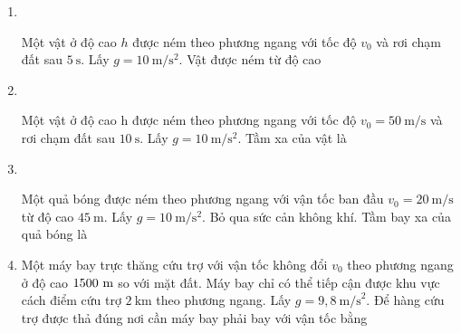 \begin{enumerate}[label=\bfseries Câu \arabic*:]
\item {}\\
{Một vật ở độ cao $h$ được ném theo phương ngang với tốc độ $v_0$ và rơi chạm đất sau $\SI{5}{\second}$. Lấy $g=\SI{10}{\meter/\second^2}$. Vật được ném từ độ cao
	\begin{mcq}(4)
		\item $\SI{100}{\meter}$.
		\item $\SI{125}{\meter}$.
		\item $\SI{200}{\meter}$.
		\item $\SI{30}{\meter}$.
	\end{mcq}

}

\item {}\\
{Một vật ở độ cao h được ném theo phương ngang với tốc độ $v_0 = \SI{50}{\meter/\second}$ và rơi chạm đất sau $\SI{10}{\second}$. Lấy $g = \SI{10}{\meter/\second^2}$. Tầm xa của vật là
}

\item {}\\
{Một quả bóng được ném theo phương ngang với vận tốc ban đầu $v_0 = \SI{20}{\meter/\second}$ từ độ cao $\SI{45}{\meter}$. Lấy $g = \SI{10}{\meter/\second^2}$. Bỏ qua sức cản không khí. Tầm bay xa của quả bóng là
}

	\item {}
	
	
	{Một máy bay trực thăng cứu trợ với vận tốc không đổi $v_0$ theo phương ngang ở độ cao $1500\ \text m$ so với mặt đất. Máy bay chỉ có thể tiếp cận được khu vực cách điểm cứu trợ $2\ \text{km}$ theo phương ngang. Lấy $g=9,8\ \text {m/s}^2$. Để hàng cứu trợ được thả đúng nơi cần máy bay phải bay với vận tốc bằng
	}
	

\end{enumerate}
